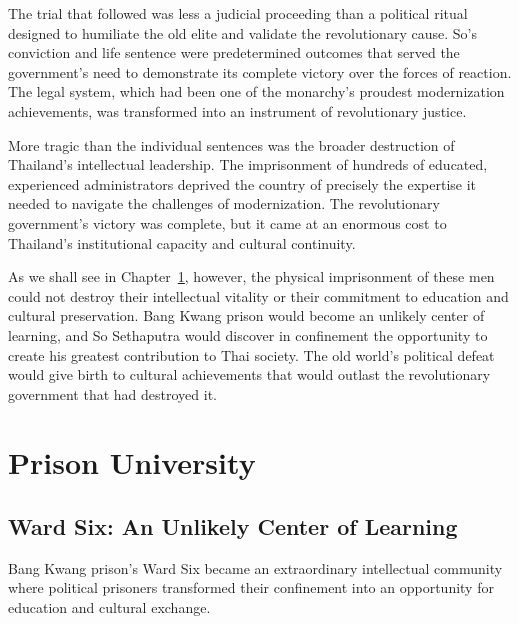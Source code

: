 \documentclass[
  Letterpaper,
]{scrbook}
\begin{document}
The trial that followed was less a judicial proceeding than a political
ritual designed to humiliate the old elite and validate the
revolutionary cause. So's conviction and life sentence were
predetermined outcomes that served the government's need to demonstrate
its complete victory over the forces of reaction. The legal system,
which had been one of the monarchy's proudest modernization
achievements, was transformed into an instrument of revolutionary
justice.

More tragic than the individual sentences was the broader destruction of
Thailand's intellectual leadership. The imprisonment of hundreds of
educated, experienced administrators deprived the country of precisely
the expertise it needed to navigate the challenges of modernization. The
revolutionary government's victory was complete, but it came at an
enormous cost to Thailand's institutional capacity and cultural
continuity.

As we shall see in Chapter~\ref{sec-prison-university}, however, the
physical imprisonment of these men could not destroy their intellectual
vitality or their commitment to education and cultural preservation.
Bang Kwang prison would become an unlikely center of learning, and So
Sethaputra would discover in confinement the opportunity to create his
greatest contribution to Thai society. The old world's political defeat
would give birth to cultural achievements that would outlast the
revolutionary government that had destroyed it.


\chapter{Prison University}\label{sec-prison-university}

\section{Ward Six: An Unlikely Center of
Learning}\label{ward-six-an-unlikely-center-of-learning}

Bang Kwang prison's Ward Six became an extraordinary intellectual
community where political prisoners transformed their confinement into
an opportunity for education and cultural exchange.
\end{document}
